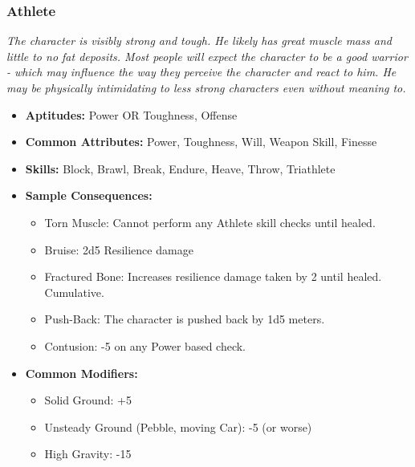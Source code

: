 \subsubsection{Athlete}\label{Athlete}
\textit{The character is visibly strong and tough.
He likely has great muscle mass and little to no fat deposits.
Most people will expect the character to be a good warrior - which may influence the way they perceive the character and react to him.
He may be physically intimidating to less strong characters even without meaning to.}
\begin{itemize}
	\item \textbf{Aptitudes:} Power OR Toughness, Offense
	\item \textbf{Common Attributes:} Power, Toughness, Will, Weapon Skill, Finesse
	\item \textbf{Skills:} Block, Brawl, Break, Endure, Heave, Throw, Triathlete
	\item \textbf{Sample Consequences:} 
	\begin{itemize}
		\item Torn Muscle: Cannot perform any Athlete skill checks until healed.
		\item Bruise: 2d5 Resilience damage
		\item Fractured Bone: Increases resilience damage taken by 2 until healed. Cumulative.
		\item Push-Back: The character is pushed back by 1d5 meters.
		\item Contusion: -5 on any Power based check.
	\end{itemize}
	\item \textbf{Common Modifiers:}
	\begin{itemize}
		\item Solid Ground: +5
		\item Unsteady Ground (Pebble, moving Car): -5 (or worse)
		\item High Gravity: -15
	\end{itemize}
\end{itemize}


